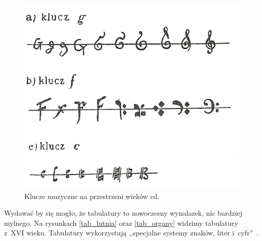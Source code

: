 \documentclass[polish,thesis,12pt]{dcsbook}
\begin{document}
\begin{figure}[H]
\begin{minipage}[t]{0.45\linewidth}
    \includegraphics[scale=1.75,bb=0 0 142 122]{img/klucze2.png}
    \caption{Klucze muzyczne na przestrzeni wieków cd.~\cite{Encyklopedia}}
    \label{klucze2}
  \end{minipage}
\end{figure}

Wydawać by się mogło, że tabulatury to nowoczesny wynalazek, nic bardziej mylnego. Na rysunkach \ref{tab_lutnia} oraz \ref{tab_organy} widzimy tabulatury z~XVI wieku. Tabulatury wykorzystują ,,specjalne systemy znaków, liter i~cyfr''~\cite{Slowniczek}.
\end{document}
